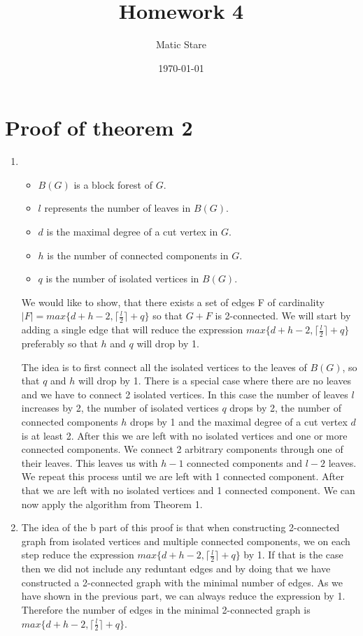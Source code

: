 \documentclass{article}
\title{Homework 4}
\author{Matic Stare}
\date{\today}
\begin{document}
\maketitle


\section*{Proof of theorem 2}\label{sec:p1}

\begin{enumerate}[label*=\alph*)]
    \item 
    \begin{itemize}
        \item $B(G)$ is a block forest of $G$.
        \item $l$ represents the number of leaves in $B(G)$.
        \item $d$ is the maximal degree of a cut vertex in $G$.
        \item $h$ is the number of connected components in $G$.
        \item $q$ is the number of isolated vertices in $B(G)$.
    \end{itemize}
    We would like to show, that there exists a set of edges F of cardinality $|F| = max \{d + h - 2, \lceil \frac{l}{2} \rceil + q \}$ so that $G + F$ is 2-connected. We will start by adding a single edge that will reduce the expression $max \{d + h - 2, \lceil \frac{l}{2} \rceil + q \}$ preferably so that $h$ and $q$ will drop by 1.

    The idea is to first connect all the isolated vertices to the leaves of $B(G)$, so that $q$ and $h$ will drop by 1. There is a special case where there are no leaves and we have to connect 2 isolated vertices. In this case the number of leaves $l$ increases by 2, the number of isolated vertices $q$ drops by 2, the number of connected components $h$ drops by 1 and the maximal degree of a cut vertex $d$ is at least 2. After this we are left with no isolated vertices and one or more connected components. We connect 2 arbitrary components through one of their leaves. This leaves us with $h - 1$ connected components and $l - 2$ leaves. We repeat this process until we are left with 1 connected component. After that we are left with no isolated vertices and 1 connected component. We can now apply the algorithm from Theorem 1.
    
    \item  
    The idea of the b part of this proof is that when constructing 2-connected graph from isolated vertices and multiple connected components, we on each step reduce the expression $max \{d + h - 2, \lceil \frac{l}{2} \rceil + q \}$ by 1. If that is the case then we did not include any reduntant edges and by doing that we have constructed a 2-connected graph with the minimal number of edges. As we have shown in the previous part, we can always reduce the expression by 1. Therefore the number of edges in the minimal 2-connected graph is $max \{d + h - 2, \lceil \frac{l}{2} \rceil + q \}$.


\end{enumerate}
\end{document}
